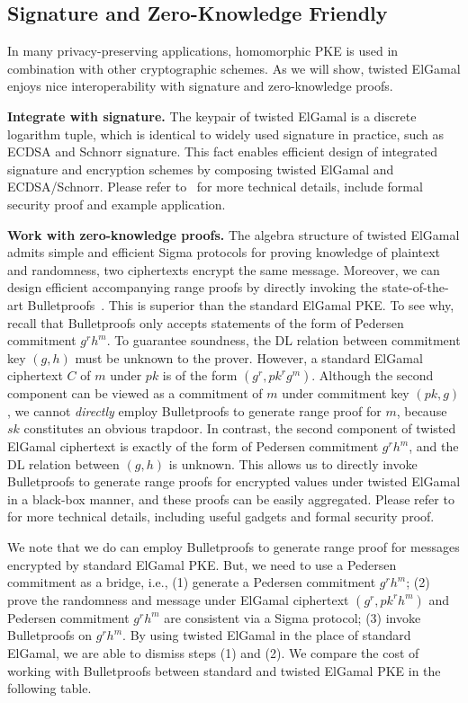 \documentclass[a4paper,10pt]{article}
\begin{document}
\subsection{Signature and Zero-Knowledge Friendly}
In many privacy-preserving applications, homomorphic PKE is used in combination with other cryptographic schemes. 
As we will show, twisted ElGamal enjoys nice interoperability with signature and zero-knowledge proofs.   
\begin{trivlist}
\item \textbf{Integrate with signature.} The keypair of twisted ElGamal is a discrete logarithm tuple, 
    which is identical to widely used signature in practice, such as ECDSA and Schnorr signature.
    This fact enables efficient design of integrated signature and encryption schemes 
    by composing twisted ElGamal and ECDSA/Schnorr. 
    Please refer to~\cite{CMT2019} for more technical details, include formal security proof and example application. 

\item \textbf{Work with zero-knowledge proofs.} The algebra structure of twisted ElGamal 
    admits simple and efficient Sigma protocols 
for proving knowledge of plaintext and randomness, two ciphertexts encrypt the same message. 
Moreover, we can design efficient accompanying range proofs 
by directly invoking the state-of-the-art Bulletproofs~\cite{BulletProof2018}.  
This is superior than the standard ElGamal PKE. 
To see why, recall that Bulletproofs only accepts statements of the form of Pedersen commitment $g^r h^m$.  
To guarantee soundness, the DL relation between commitment key $(g, h)$ must be unknown to the prover. 
However, a standard ElGamal ciphertext $C$ of $m$ under $pk$ is of the form $(g^r, pk^r g^m)$. 
Although the second component can be viewed as a commitment of $m$ under commitment key $(pk, g)$,   
we cannot \emph{directly} employ Bulletproofs to generate range proof for $m$, because $sk$ constitutes an obvious trapdoor. 
In contrast, the second component of twisted ElGamal ciphertext is exactly of the form of Pedersen commitment $g^r h^m$, 
and the DL relation between $(g, h)$ is unknown. 
This allows us to directly invoke Bulletproofs to generate range proofs for encrypted values under twisted ElGamal 
in a black-box manner, and these proofs can be easily aggregated. 
Please refer to~\cite{CMT2019} for more technical details, including useful gadgets and formal security proof. 

We note that we do can employ Bulletproofs to generate range proof for messages encrypted by standard ElGamal PKE. 
But, we need to use a Pedersen commitment as a bridge, 
i.e., (1) generate a Pedersen commitment $g^r h^m$; (2) prove the randomness and message under ElGamal ciphertext $(g^r, pk^r h^m)$ 
and Pedersen commitment $g^r h^m$ are consistent via a Sigma protocol; (3) invoke Bulletproofs on $g^r h^m$. 
By using twisted ElGamal in the place of standard ElGamal, we are able to dismiss steps (1) and (2).  
We compare the cost of working with Bulletproofs between standard and twisted ElGamal PKE in the following table. 
\end{trivlist}
\end{document}
